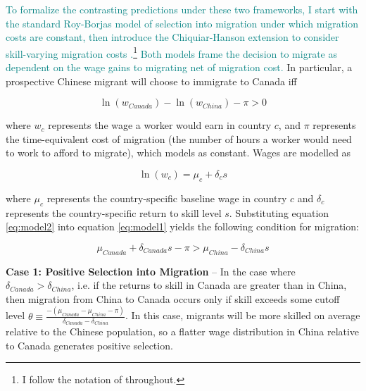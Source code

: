 \textcolor{teal}{To formalize the contrasting predictions under these two frameworks, I start with the standard Roy-Borjas model of selection into migration under which migration costs are constant, then introduce the Chiquiar-Hanson extension to consider skill-varying migration costs \citep{roy1951,borjas1987,chiquiarhanson2005}.\footnote{I follow the notation of \citet{chiquiarhanson2005} throughout.} Both models frame the decision to migrate as dependent on the wage gains to migrating net of migration cost.} In particular, a prospective Chinese migrant will choose to immigrate to Canada iff

\begin{equation}
    \label{eq:model1}
    \ln (w_{Canada}) - \ln(w_{China}) - \pi > 0
\end{equation}

where $w_c$ represents the wage a worker would earn in country $c$, and $\pi$ represents the time-equivalent cost of migration (the number of hours a worker would need to work to afford to migrate), which \citet{borjas1987} models as constant. Wages are modelled as

\begin{equation}
    \label{eq:model2}
    \ln (w_c) = \mu_c + \delta_c s
\end{equation}

where $\mu_c$ represents the country-specific baseline wage in country $c$ and $\delta_c$ represents the country-specific return to skill level $s$. Substituting equation \ref{eq:model2} into equation \ref{eq:model1} yields the following condition for migration:

\begin{equation}
    \label{eq:model3}
    \mu_{Canada} + \delta_{Canada}s - \pi > \mu_{China} - \delta_{China}s
\end{equation}

\textbf{Case 1: Positive Selection into Migration} -- In the case where $\delta_{Canada} > \delta_{China}$, i.e. if the returns to skill in Canada are greater than in China, then migration from China to Canada occurs only if skill exceeds some cutoff level $\theta \equiv \frac{ -(\mu_{Canada}-\mu_{China}-\pi)}{\delta_{Canada} - \delta_{China}}$. In this case, migrants will be more skilled on average relative to the Chinese population, so a flatter wage distribution in China relative to Canada generates positive selection.

